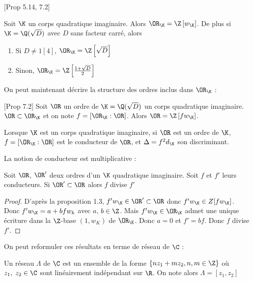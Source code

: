 \begin{Prop}\cite{Cox}[Prop 5.14, 7.2] 
	
	Soit $\K$ un corps quadratique imaginaire. Alors $\OR_{\K} = \Z\left[ w_{\K}\right] $. De plus si $\K = \Q(\sqrt{D})$ avec $D$ sans facteur carré, alors
	\begin{enumerate}
		\item Si $D \neq 1 [4]$, $\OR_{\K} = \Z\left[ \sqrt{D}\right] $
		\item Sinon, $\OR_{\K} = \Z\left[ \frac{1 + \sqrt{D}}{2}\right] $
	\end{enumerate} 
	
\end{Prop}

On peut maintenant décrire la structure des ordres inclus dans $\OR_{\K}$ :

\begin{Prop}\cite{Cox}[Prop 7.2] Soit $\OR$ un ordre de $\K = \Q(\sqrt{D})$ un corps quadratique imaginaire. $\OR\subset\OR_{\K}$ et on note $f = \left[ \OR_{\K} : \OR\right]$. Alors $\OR = \Z\left[ fw_{\K}\right] $.  
\end{Prop}

\begin{Def}
	Lorsque $\K$ est un corps quadratique imaginaire, si $\OR$ est un ordre de $\K$, $f = \left[ \OR_{\K} : \OR\right]$ est le conducteur de $\OR$, et $\Delta = f^2d_{\K}$ son discriminant.
\end{Def}

La notion de conducteur est multiplicative :

\begin{Prop}
	Soit $\OR$, $\OR'$ deux ordres d'un $\K$ quadratique imaginaire. Soit $f$ et $f'$ leurs conducteurs. Si $\OR'\subset\OR$ alors $f$ divise $f'$
\end{Prop}

\begin{proof}
	D'après la proposition 1.3, $f'w_{\K}\in\OR'\subset\OR$ donc $f'w_{\K}\in Z[fw_{\K}]$. Donc $f'w_{\K} = a + bfw_{k}$ avec $a$, $b\in\Z$. Mais $f'w_{\K}\in\OR_{\K}$ admet une unique écriture dans la $\Z$-base $(1,w_{K})$ de $\OR_{\K}$. Donc $a = 0$ et $f' = bf$. Donc $f$ divise $f'$.
\end{proof}

On peut reformuler ces résultats en terme de réseau de $\C$ :

\begin{Def}
	Un réseau $\Lambda$ de $\C$ est un ensemble de la forme $\left\lbrace nz_{1} + mz_{2} , n,m\in\Z\right\rbrace$ où $z_{1},\; z_{2}\in\C$ sont linéairement indépendant sur $\R$. On note alors $\Lambda = \left[ z_{1}, z_{2}\right] $
\end{Def}

